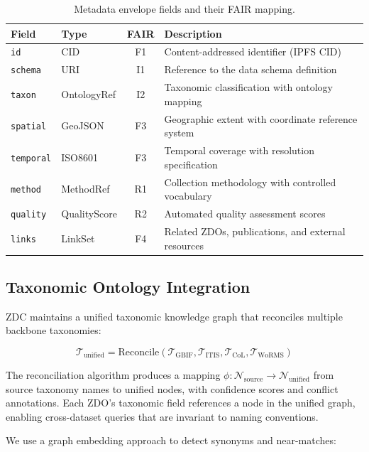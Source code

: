 \documentclass[11pt,a4paper]{article}
\begin{document}
\begin{table}[H]
\centering
\caption{Metadata envelope fields and their FAIR mapping.}
\label{tab:metadata}
\begin{tabularx}{\textwidth}{@{}llcX@{}}
\toprule
\textbf{Field} & \textbf{Type} & \textbf{FAIR} & \textbf{Description} \\
\midrule
\texttt{id} & CID & F1 & Content-addressed identifier (IPFS CID) \\
\texttt{schema} & URI & I1 & Reference to the data schema definition \\
\texttt{taxon} & OntologyRef & I2 & Taxonomic classification with ontology mapping \\
\texttt{spatial} & GeoJSON & F3 & Geographic extent with coordinate reference system \\
\texttt{temporal} & ISO8601 & F3 & Temporal coverage with resolution specification \\
\texttt{method} & MethodRef & R1 & Collection methodology with controlled vocabulary \\
\texttt{quality} & QualityScore & R2 & Automated quality assessment scores \\
\texttt{links} & LinkSet & F4 & Related ZDOs, publications, and external resources \\
\bottomrule
\end{tabularx}
\end{table}

\subsection{Taxonomic Ontology Integration}

ZDC maintains a unified taxonomic knowledge graph that reconciles multiple backbone taxonomies:

\begin{equation}
    \mathcal{T}_{\text{unified}} = \text{Reconcile}(\mathcal{T}_{\text{GBIF}}, \mathcal{T}_{\text{ITIS}}, \mathcal{T}_{\text{CoL}}, \mathcal{T}_{\text{WoRMS}})
\end{equation}

The reconciliation algorithm produces a mapping $\phi: \mathcal{N}_{\text{source}} \rightarrow \mathcal{N}_{\text{unified}}$ from source taxonomy names to unified nodes, with confidence scores and conflict annotations.
Each ZDO's taxonomic field references a node in the unified graph, enabling cross-dataset queries that are invariant to naming conventions.

We use a graph embedding approach to detect synonyms and near-matches:
\end{document}
